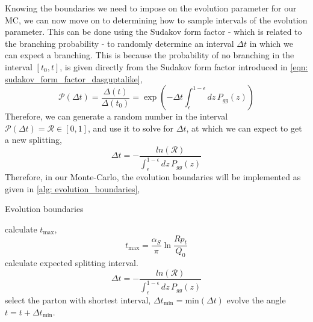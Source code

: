 \documentclass[main.tex]{subfiles}
\begin{document}
Knowing the boundaries we need to impose on the evolution parameter for our MC, we can now move on to determining how to sample intervals of the evolution parameter.
This can be done using the Sudakov form factor - which is related to the branching probability - to randomly determine an interval \(\Delta t\) in which we can expect a branching. This is because the probability of no branching in the interval \([t_0, t]\), is given directly from the Sudakov form factor introduced in \autoref{eqn: sudakov_form_factor_dasguptalike},
\begin{equation}\label{eqn: branching_probability_from_sudakov_gg}
    \mathcal{P}(\Delta t) = \frac{\Delta(t)}{\Delta(t_0)} = \exp\left(-\Delta t \int_\epsilon^{1-\epsilon}dz \, P_{gg}(z)\right) 
\end{equation}
Therefore, we can generate a random number in the interval \(\mathcal{P}(\Delta t) = \mathcal{R} \in [0,1]\), and use it to solve for \(\Delta t\), at which we can expect to get a new splitting, 
\begin{equation}\label{eqn: expected_branching_interval}
    \Delta t = -\frac{ln(\mathcal{R})}{ \int_\epsilon^{1-\epsilon}dz \, P_{gg}(z)} 
\end{equation}
Therefore, in our Monte-Carlo, the evolution boundaries will be implemented as given in \autoref{alg: evolution_boundaries},
\begin{center}
\begin{minipage}{.8\linewidth}
\begin{algorithm}[H]
\caption{Evolution boundaries}
\label{alg: evolution_boundaries}
\begin{algorithmic}[1]
    \State calculate \(t_{\text{max}}\),
         \[t_{\text{max}} = \frac{\alpha_S}{\pi} \ln \frac{Rp_t}{Q_0}\]
        \State calculate expected splitting interval. \[\Delta t = -\frac{ln(\mathcal{R})}{ \int_\epsilon^{1-\epsilon}dz \, P_{gg}(z)}\]
        \EndFor
    \State select the parton with shortest interval, \(\Delta t_{\text{min}} = \text{min}(\Delta t)\)
    \State evolve the angle \(t = t + \Delta t_{\text{min}}\).
    \EndWhile
\end{algorithmic}
\end{algorithm}
\end{minipage}
\end{center}
\end{document}
